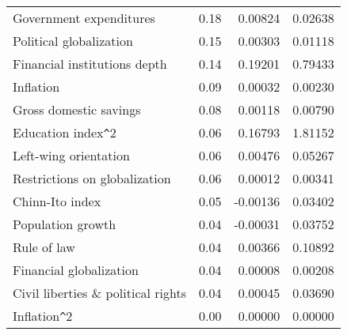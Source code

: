 \documentclass[a4paper,11pt]{article}
\begin{document}
\begin{table}[!ht]
\begin{tabular}{lrrr}
  Government expenditures & 0.18 & 0.00824 & 0.02638 \\ 
  Political globalization & 0.15 & 0.00303 & 0.01118 \\ 
  Financial institutions depth & 0.14 & 0.19201 & 0.79433 \\ 
  Inflation & 0.09 & 0.00032 & 0.00230 \\ 
  Gross domestic savings & 0.08 & 0.00118 & 0.00790 \\ 
  Education index\verb|^|2 & 0.06 & 0.16793 & 1.81152 \\ 
  Left-wing orientation & 0.06 & 0.00476 & 0.05267 \\ 
  Restrictions on globalization & 0.06 & 0.00012 & 0.00341 \\ 
  Chinn-Ito index & 0.05 & -0.00136 & 0.03402 \\ 
  Population growth & 0.04 & -0.00031 & 0.03752 \\ 
  Rule of law & 0.04 & 0.00366 & 0.10892 \\ 
  Financial globalization & 0.04 & 0.00008 & 0.00208 \\
  Civil liberties \& political rights & 0.04 & 0.00045 & 0.03690 \\ 
  Inflation\verb|^|2 & 0.00 & 0.00000 & 0.00000 \\
    \end{tabular}
    \end{table}
%
\clearpage
%
\end{document}
